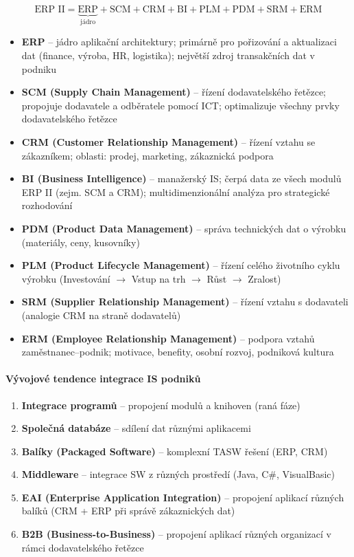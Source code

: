 \[
  \text{ERP II} = \underbrace{\text{ERP}}_{\text{jádro}} + \text{SCM} + \text{CRM} + \text{BI}
  + \text{PLM} + \text{PDM} + \text{SRM} + \text{ERM}
\]

\begin{itemize}
  \item \textbf{ERP} -- jádro aplikační architektury; primárně pro pořizování a aktualizaci dat
    (finance, výroba, HR, logistika); největší zdroj transakčních dat v podniku
  \item \textbf{SCM (Supply Chain Management)} -- řízení dodavatelského řetězce; propojuje
    dodavatele a odběratele pomocí ICT; optimalizuje všechny prvky dodavatelského řetězce
  \item \textbf{CRM (Customer Relationship Management)} -- řízení vztahu se zákazníkem; oblasti:
    prodej, marketing, zákaznická podpora
  \item \textbf{BI (Business Intelligence)} -- manažerský IS; čerpá data ze všech modulů ERP II
    (zejm. SCM a CRM); multidimenzionální analýza pro strategické rozhodování
  \item \textbf{PDM (Product Data Management)} -- správa technických dat o výrobku
    (materiály, ceny, kusovníky)
  \item \textbf{PLM (Product Lifecycle Management)} -- řízení celého životního cyklu výrobku
    (Investování $\rightarrow$ Vstup na trh $\rightarrow$ Růst $\rightarrow$ Zralost)
  \item \textbf{SRM (Supplier Relationship Management)} -- řízení vztahu s dodavateli
    (analogie CRM na straně dodavatelů)
  \item \textbf{ERM (Employee Relationship Management)} -- podpora vztahů zaměstnanec--podnik;
    motivace, benefity, osobní rozvoj, podniková kultura
\end{itemize}

\paragraph{Vývojové tendence integrace IS podniků}
\begin{enumerate}
  \item \textbf{Integrace programů} -- propojení modulů a knihoven (raná fáze)
  \item \textbf{Společná databáze} -- sdílení dat různými aplikacemi
  \item \textbf{Balíky (Packaged Software)} -- komplexní TASW řešení (ERP, CRM)
  \item \textbf{Middleware} -- integrace SW z různých prostředí (Java, C\#, VisualBasic)
  \item \textbf{EAI (Enterprise Application Integration)} -- propojení aplikací různých balíků
    (CRM + ERP při správě zákaznických dat)
  \item \textbf{B2B (Business-to-Business)} -- propojení aplikací různých organizací
    v rámci dodavatelského řetězce
\end{enumerate}

